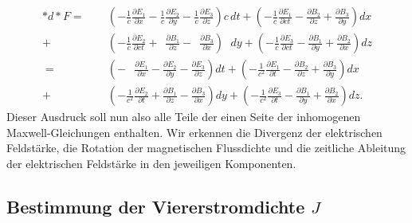\begin{align*}
	\ast d {\ast} F 
	= 
	\phantom{+} &\left( -\frac{1}{c}\frac{\partial E_1}{\partial x} -\frac{1}{c}\frac{\partial E_2}{\partial y} - \frac{1}{c}\frac{\partial E_3}{\partial z} \right) c \, dt +
	\left(-\frac{1}{c}\frac{\partial E_1}{\partial ct} - \frac{\partial B_2}{\partial z} + \frac{\partial B_3}{\partial y} \right) dx
	\\
	+ &\left( -\frac{1}{c}\frac{\partial E_2}{\partial ct} + \phantom{\frac{1}{c}} \frac{\partial B_1}{\partial z} - \phantom{\frac{1}{c}} \frac{\partial B_3}{\partial x} \right) \phantom{c \,}dy +
	\left( -\frac{1}{c}\frac{\partial E_3}{\partial ct} - \frac{\partial B_1}{\partial y} + \frac{\partial B_2}{\partial x} \right) dz
	\\[2ex]
	=
	\phantom{+} &\left( -\phantom{\frac{1}{c^2}}\frac{\partial E_1}{\partial x} -\frac{\partial E_2}{\partial y} - \frac{\partial E_3}{\partial z} \right) dt +
	\left(-\frac{1}{c^2}\frac{\partial E_1}{\partial t} - \frac{\partial B_2}{\partial z} + \frac{\partial B_3}{\partial y} \right) dx
	\\
	+ &\left( -\frac{1}{c^2}\frac{\partial E_2}{\partial t} + \frac{\partial B_1}{\partial z} - \frac{\partial B_3}{\partial x} \right) dy +
	\left( -\frac{1}{c^2}\frac{\partial E_3}{\partial t} - \frac{\partial B_1}{\partial y} + \frac{\partial B_2}{\partial x} \right) dz.
\end{align*}
Dieser Ausdruck soll nun also alle Teile der einen Seite der inhomogenen Maxwell-Gleichungen enthalten.
Wir erkennen die Divergenz der elektrischen Feldstärke, die Rotation der magnetischen Flussdichte und die zeitliche Ableitung der elektrischen Feldstärke in den jeweiligen Komponenten.
\subsection{Bestimmung der Viererstromdichte $J$}

